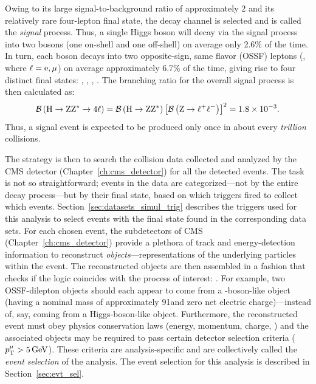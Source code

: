 Owing to its large signal-to-background ratio of approximately 2 and its relatively rare four-lepton final state, the \hzzfourl decay channel is selected and is called the \emph{signal} process.
Thus, a single Higgs boson will decay via the signal process into two \PZ bosons (one on-shell and one off-shell) on average only 2.6\% of the time.
In turn, each \PZ boson decays into two opposite-sign, same flavor (OSSF) leptons (\Ztolplm, where $\ell = \mathrm{e}, \mu$) on average approximately 6.7\% of the time, giving rise to four distinct final states:
\foure, \fourmu, \twoetwomu, \twomutwoe.
The branching ratio for the overall signal process is then calculated as: %
\begin{equation*}
    \BRof{\hzzfourl} = \BRof{\htozz} \left[ \BRof{\Ztolplm} \right]^2 = 1.8\tentotheminus{3}.
\end{equation*}
Thus, a signal event is expected to be produced only once in about every \emph{trillion} \pp collisions.

The strategy is then to search the \pp collision data collected and analyzed by the CMS detector (Chapter~\ref{ch:cms_detector}) for all the detected \hzzfourl events.
The task is not so straightforward;
events in the data are categorized---not by the entire decay process---but by their final state, based on which triggers fired to collect which events.
Section~\ref{sec:datasets_simul_trig} describes the triggers used for this analysis to select events with the \fourl final state found in the corresponding data sets.
For each chosen event, the subdetectors of CMS (Chapter~\ref{ch:cms_detector}) provide a plethora of track and energy-detection information to reconstruct \emph{objects}---representations of the underlying particles within the event.
The reconstructed objects are then assembled in a fashion that checks if the logic coincides with the process of interest: \hzzfourl.  %
For example, two OSSF-dilepton objects should each appear to come from a \PZ-boson-like object (\eg having a nominal mass of approximately 91\GeV and zero net electric charge)---instead of, say, coming from a Higgs-boson-like object.
Furthermore, the reconstructed event must obey physics conservation laws (energy, momentum, charge, \etc) and the associated objects may be required to pass certain detector selection criteria (\eg $p_{\mathrm{T}}^\mu > 5\,\text{Ge\hspace{-.08em}V}$).
These criteria are analysis-specific and are collectively called the \emph{event selection} of the analysis.
The event selection for this analysis is described in Section~\ref{sec:evt_sel}.  %

